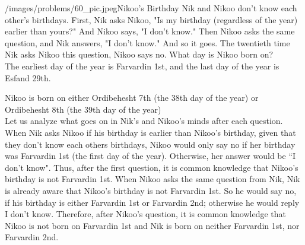 \begin{problem}{/images/problems/60_pic.jpeg}{Nikoo's Birthday}  Nik and Nikoo don't know each other's birthdays.
First, Nik asks Nikoo, "Is my birthday (regardless of the year) earlier than yours?" And Nikoo says, "I don't know."
Then Nikoo asks the same question, and Nik answers, "I don't know."
And so it goes. The twentieth time Nik asks Nikoo this question, Nikoo says no. What day is Nikoo born on?\\[0.2cm]
	

The earliest day of the year is Farvardin 1st, and the last day of the year is Esfand 29th.
\end{problem}
\begin{solution}
Nikoo is born on either Ordibehesht 7th (the 38th day of the year) or Ordibehesht 8th (the 39th day of the year) \\[0.2cm]

Let us analyze what goes on in Nik's and Nikoo's minds after each question. 
When Nik asks Nikoo if his birthday is earlier than Nikoo's birthday, given that they don't know each others birthdays, Nikoo would only say no if her birthday was Farvardin 1st (the first day of the year). Otherwise, her answer would be ``I don't know". Thus, after the first question, it is common knowledge that Nikoo's birthday is not Farvardin 1st. When Nikoo asks the same question from Nik, Nik is already aware that Nikoo's birthday is not Farvardin 1st. So he would say no, if his birthday is either Farvardin 1st or Farvardin 2nd; otherwise he would reply I don't know. Therefore, after Nikoo's question, it is common knowledge that Nikoo is not born on Farvardin 1st and Nik is born on neither Farvardin 1st, nor Farvardin 2nd.


\end{solution}
